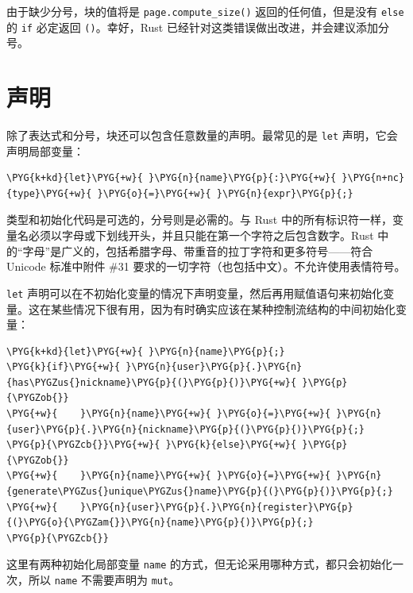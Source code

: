 由于缺少分号，块的值将是 \texttt{page.compute\_size()} 返回的任何值，但是没有 \texttt{else} 的 \texttt{if} 必定返回 \texttt{()}。幸好，Rust 已经针对这类错误做出改进，并会建议添加分号。

\section{声明}

除了表达式和分号，块还可以包含任意数量的声明。最常见的是 \texttt{let} 声明，它会声明局部变量：

\begin{Verbatim}[commandchars=\\\{\},breaklines=true,breakanywhere=true,fontsize=\codefont,xleftmargin=17bp]
\PYG{k+kd}{let}\PYG{+w}{ }\PYG{n}{name}\PYG{p}{:}\PYG{+w}{ }\PYG{n+nc}{type}\PYG{+w}{ }\PYG{o}{=}\PYG{+w}{ }\PYG{n}{expr}\PYG{p}{;}
\end{Verbatim}

类型和初始化代码是可选的，分号则是必需的。与 Rust 中的所有标识符一样，变量名必须以字母或下划线开头，并且只能在第一个字符之后包含数字。Rust 中的“字母”是广义的，包括希腊字母、带重音的拉丁字符和更多符号——符合 Unicode 标准中附件 \#31 要求的一切字符（也包括中文）。不允许使用表情符号。

\texttt{let} 声明可以在不初始化变量的情况下声明变量，然后再用赋值语句来初始化变量。这在某些情况下很有用，因为有时确实应该在某种控制流结构的中间初始化变量：

\begin{Verbatim}[commandchars=\\\{\},breaklines=true,breakanywhere=true,fontsize=\codefont,xleftmargin=17bp]
\PYG{k+kd}{let}\PYG{+w}{ }\PYG{n}{name}\PYG{p}{;}
\PYG{k}{if}\PYG{+w}{ }\PYG{n}{user}\PYG{p}{.}\PYG{n}{has\PYGZus{}nickname}\PYG{p}{(}\PYG{p}{)}\PYG{+w}{ }\PYG{p}{\PYGZob{}}
\PYG{+w}{    }\PYG{n}{name}\PYG{+w}{ }\PYG{o}{=}\PYG{+w}{ }\PYG{n}{user}\PYG{p}{.}\PYG{n}{nickname}\PYG{p}{(}\PYG{p}{)}\PYG{p}{;}
\PYG{p}{\PYGZcb{}}\PYG{+w}{ }\PYG{k}{else}\PYG{+w}{ }\PYG{p}{\PYGZob{}}
\PYG{+w}{    }\PYG{n}{name}\PYG{+w}{ }\PYG{o}{=}\PYG{+w}{ }\PYG{n}{generate\PYGZus{}unique\PYGZus{}name}\PYG{p}{(}\PYG{p}{)}\PYG{p}{;}
\PYG{+w}{    }\PYG{n}{user}\PYG{p}{.}\PYG{n}{register}\PYG{p}{(}\PYG{o}{\PYGZam{}}\PYG{n}{name}\PYG{p}{)}\PYG{p}{;}
\PYG{p}{\PYGZcb{}}
\end{Verbatim}

这里有两种初始化局部变量 \texttt{name} 的方式，但无论采用哪种方式，都只会初始化一次，所以 \texttt{name} 不需要声明为 \texttt{mut}。

